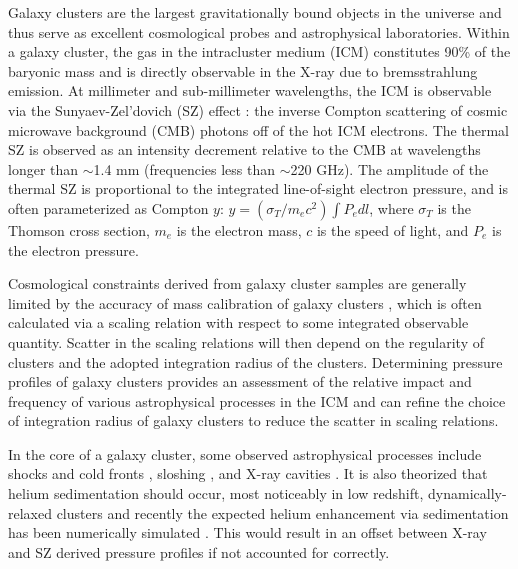 \documentclass[iop,numberedappendix,apj]{emulateapj}
\begin{document}
Galaxy clusters are the largest gravitationally bound objects in the universe and thus serve as excellent cosmological probes 
and astrophysical laboratories. Within a galaxy cluster, the gas in the intracluster medium (ICM) constitutes 90\% of the
baryonic mass \citep{vikhlinin2006b} and is directly observable in the X-ray due to bremsstrahlung emission. 
At millimeter and sub-millimeter wavelengths, the ICM is observable via the Sunyaev-Zel'dovich (SZ) effect 
\citep{sunyaev1972}: the inverse Compton scattering of cosmic microwave background (CMB) photons off of
the hot ICM electrons. The thermal SZ is observed as an intensity decrement relative to the CMB at wavelengths longer 
than $\sim$1.4 mm (frequencies less than $\sim$220 GHz). The amplitude of the thermal SZ is proportional to the integrated
line-of-sight electron pressure, and is often parameterized as Compton $y$: $y = (\sigma_T / m_e c^2) \int P_e dl$, where
$\sigma_T$ is the Thomson cross section, $m_e$ is the electron mass, $c$ is the speed of light, and $P_e$ is the electron
pressure.

Cosmological constraints derived from galaxy cluster samples are generally limited by the accuracy of mass calibration of 
galaxy clusters \citep[e.g.][]{hasselfield2013, reichardt2013}, which is often calculated via a scaling relation with 
respect to some integrated observable quantity. Scatter in the scaling relations will then depend on the regularity of 
clusters and the adopted integration radius of the clusters. Determining pressure profiles of galaxy clusters provides an 
assessment of the relative impact and frequency of various astrophysical processes in the ICM and can refine the choice of 
integration radius of galaxy clusters to reduce the scatter in scaling relations.

In the core of a galaxy cluster, some observed astrophysical processes include shocks and cold fronts 
\citep[e.g.][]{markevitch2007}, sloshing \citep[e.g.][]{fabian2006}, and X-ray cavities \citep{mcnamara2007}. 
It is also theorized that helium sedimentation should occur, most noticeably in low redshift, dynamically-relaxed 
clusters \citep{abramopoulos1981, gilfanov1984} 
and recently the expected helium enhancement via sedimentation has been numerically simulated \citep{peng2009}. 
This would result in an offset between X-ray and SZ derived pressure profiles if not accounted for correctly.
\end{document}
